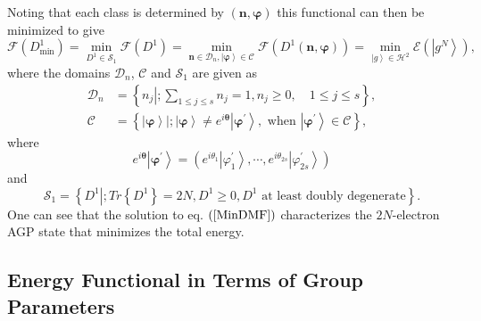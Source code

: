 \documentclass[aps,preprint]{revtex4}%
\begin{document}
Noting that each class is determined by $\left(  \mathbf{n},\mathbf{\varphi
}\right)  $ this functional can then be minimized to give
\begin{equation}
\mathcal{F}\left(  D_{\min}^{1}\right)  =\min_{D^{1}\in\mathcal{S}_{1}%
}\mathcal{F}\left(  D^{1}\right)  =\min_{\mathbf{n\in}\mathcal{D}%
_{n},\left\vert \mathbf{\varphi}\right\rangle \in\mathcal{C}}\mathcal{F}%
\left(  D^{1}\left(  \mathbf{n},\mathbf{\varphi}\right)  \right)
=\min_{\left\vert g\right\rangle \in\mathcal{H}^{2}}\mathcal{E}\left(
\left\vert g^{N}\right\rangle \right)  , \label{MinDMF}%
\end{equation}
where the domains $\mathcal{D}_{n}$, $\mathcal{C}$ and $\mathcal{S}_{1}$ are
given as%
\begin{align}
\mathcal{D}_{n}  &  =\left\{  \left.  n_{j}\right\vert ;\sum_{1\leq j\leq
s}n_{j}=1,n_{j}\geq0,\quad1\leq j\leq s\right\}  ,\\
\mathcal{C}  &  =\left\{  \left.  \left\vert \mathbf{\varphi}\right\rangle
\right\vert ;\left\vert \mathbf{\varphi}\right\rangle \neq e^{i\mathbf{\theta
}}\left\vert \mathbf{\varphi}^{\prime}\right\rangle ,\text{ when }\left\vert
\mathbf{\varphi}^{\prime}\right\rangle \in\mathcal{C}\right\}  ,
\end{align}
where
\begin{equation}
e^{i\mathbf{\theta}}\left\vert \mathbf{\varphi}^{\prime}\right\rangle =\left(
e^{i\theta_{1}}\left\vert \varphi_{1}^{\prime}\right\rangle ,\cdots
,e^{i\theta_{2s}}\left\vert \varphi_{2s}^{\prime}\right\rangle \right)
\end{equation}
and
\begin{equation}
\mathcal{S}_{1}=\left\{  \left.  D^{1}\right\vert ;Tr\left\{  D^{1}\right\}
=2N,D^{1}\geq0,D^{1}\text{ at least doubly degenerate}\right\}  .
\end{equation}
One can see that the solution to eq. $\left(  \ref{MinDMF}\right)  $
characterizes the $2N$-electron AGP state that minimizes the total energy.

\subsection{Energy Functional in Terms of Group Parameters\label{Group_Param}}
\end{document}
